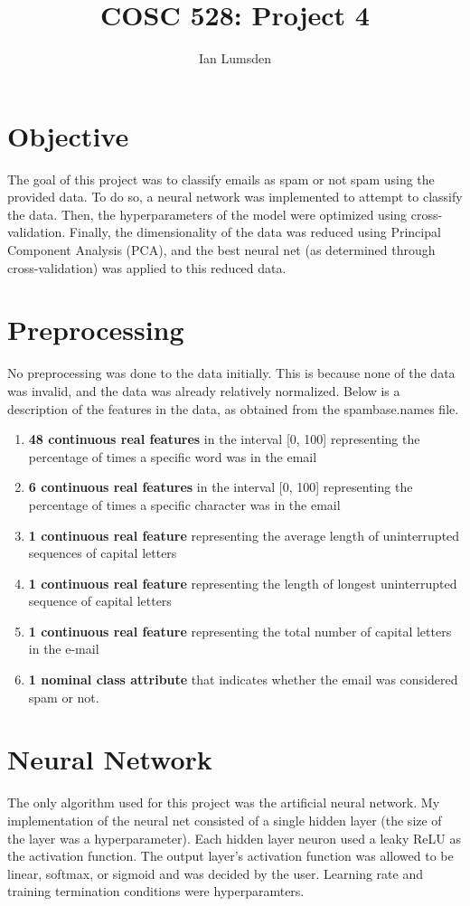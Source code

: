 \documentclass[12pt]{article}
\title{COSC 528: Project 4}
\author{Ian Lumsden}
\begin{document}
	\maketitle
	\newpage
	
	\section{Objective}
	The goal of this project was to classify emails as spam or not spam using the provided data. To do so, a neural network was implemented to attempt to classify the data. Then, the hyperparameters of the model were optimized using cross-validation. Finally, the dimensionality of the data was reduced using Principal Component Analysis (PCA), and the best neural net (as determined through cross-validation) was applied to this reduced data.
	
	\section{Preprocessing}
	No preprocessing was done to the data initially. This is because none of the data was invalid, and the data was already relatively normalized. Below is a description of the features in the data, as obtained from the spambase.names file.
	\begin{enumerate}
		\item \textbf{48 continuous real features} in the interval [0, 100] representing the percentage of times a specific word was in the email
		\item \textbf{6 continuous real features} in the interval [0, 100] representing the percentage of times a specific character was in the email
		\item \textbf{1 continuous real feature} representing the average length of uninterrupted sequences of capital letters
		\item \textbf{1 continuous real feature} representing the length of longest uninterrupted sequence of capital letters
		\item \textbf{1 continuous real feature} representing the total number of capital letters in the e-mail
		\item \textbf{1 nominal class attribute} that indicates whether the email was considered spam or not.
	\end{enumerate}
	
	\section{Neural Network}
	The only algorithm used for this project was the artificial neural network. My implementation of the neural net consisted of a single hidden layer (the size of the layer was a hyperparameter). Each hidden layer neuron used a leaky ReLU as the activation function. The output layer's activation function was allowed to be linear, softmax, or sigmoid and was decided by the user. Learning rate and training termination conditions were hyperparamters.
	
\end{document}
